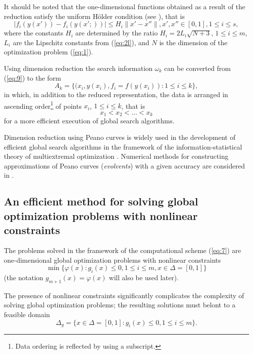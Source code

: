 \documentclass[smallextended]{svjour3}       %
\begin{document}
It should be noted that the one-dimensional functions obtained as a result of the reduction satisfy the uniform H\"older condition (see \cite{c17,c18}), that is
\begin{equation}\label{eq:11}
|f_i (y(x'))-f_i (y(x';))| \leq H_i \|x'-x''\|, x',x''\in [0,1], 1 \leq i \leq s,
\end{equation}
where the constants $H_i$ are determined by the ratio $H_i=2L_i\sqrt{N+3}$, $1 \leq i \leq m$, $L_i$ are the Lipschitz constants from (\ref{eq:2l}), and $N$ is the dimension of the optimization problem (\ref{eq:1}).

Using dimension reduction the search information $\omega_k$ can be converted from (\ref{eq:9}) to the form
\begin{equation}\label{eq:12}
A_k=\{(x_i, y(x_i), f_i=f(y(x_i)): 1 \leq i \leq k \},
\end{equation}
in which, in addition to the reduced representation, the data is arranged in ascending order\footnote{Data ordering is reflected by using a subscript.} of points $x_i$, $1 \leq i \leq k$, that is
\begin{equation}
x_1 < x_2 < \dots < x_k	
\end{equation}
for a more efficient execution of global search algorithms.

Dimension reduction using Peano curves is widely used in the development of efficient global search algorithms in the framework of the information-statistical theory of multiextremal optimization \cite{c17,c18,c23,c26,c27}. Numerical methods for constructing approximations of Peano curves (\textit{evolvents}) with a given accuracy are considered in \cite{c17,c18}.

\subsection{An efficient method for solving global optimization problems with 
nonlinear constraints}

The problems solved in the framework of the computational scheme (\ref{eq:7}) are one-dimensional global optimization problems with nonlinear constraints
\begin{equation}\label{eq:13}
\min{\{\varphi(x):g_i(x)\leq 0, 1 \leq i \leq m, x\in \Delta=[0,1]\}}
\end{equation}
(the notation $g_{m+1}(x) = \varphi(x)$ will also be used later).

The presence of nonlinear constraints significantly complicates the complexity of solving global optimization problems; the resulting solutions must belont to a feasible domain
\begin{equation}\label{eq:14}
\Delta_g  = \{ x\in \Delta=[0,1]:g_i(x)\leq 0,   1 \leq i \leq m \}.
\end{equation}
\end{document}
